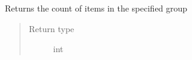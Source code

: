 \documentclass[letterpaper,10pt,english]{sphinxmanual}
\begin{document}

\begin{fulllineitems}
\label{index:pyzotero.zotero.Zotero.num_groupitems}
Returns the count of items in the specified group
\begin{quote}\begin{description}
\item[{Return type}] \leavevmode
int

\end{description}\end{quote}

\end{fulllineitems}
\end{document}

